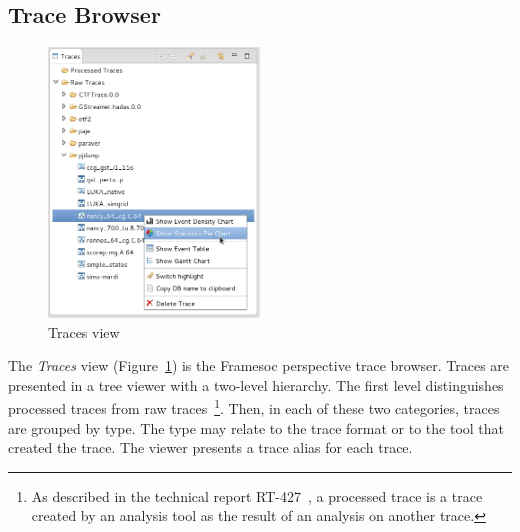 \documentclass[twoside]{article}
\begin{document}
\begin{sloppypar}
\subsection{Trace Browser}
\label{subsec:explorer}

\begin{figure}[h!]
  \centering
    \includegraphics[width=0.5\textwidth]{images/trace_browser_popup.png}
  \caption{Traces view}
  \label{fig:popup_explorer}
\end{figure}

The \emph{Traces} view (Figure~\ref{fig:popup_explorer}) is the Framesoc perspective trace browser.
Traces are presented in a tree viewer with a two-level hierarchy. 
The first level distinguishes processed traces from raw traces~\footnote{As described in the technical report RT-427~\cite{pagano:hal}, a processed trace is a trace created by an analysis tool as the result of an analysis on another trace.}. 
Then, in each of these two categories, traces are grouped by type. 
The type may relate to the trace format or to the tool that created the trace. 
The viewer presents a trace alias for each trace.


\end{sloppypar}
\end{document}
